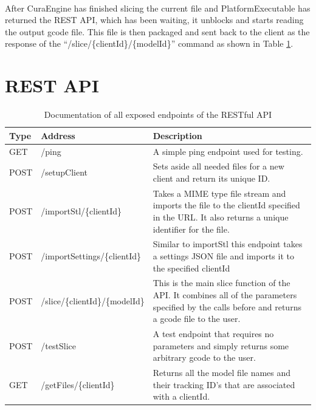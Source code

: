 \paragraph{}
After CuraEngine has finished slicing the current file and PlatformExecutable has returned the REST API, which has been waiting, it unblocks and starts reading the output gcode file.
This file is then packaged and sent back to the client as the response of the ``/slice/\{clientId\}/\{modelId\}'' command as shown in Table \ref{tab:restapi}.

\section{REST API}
\begin{table}[h]
  \centering
    \begin{tabularx}{\textwidth}{ |l|l|X| }
      \hline
      Type & Address & Description \\ \hline
      \hline
      GET & /ping & A simple ping endpoint used for testing. \\ \hline
      POST & /setupClient & Sets aside all needed files for a new client and return its unique ID. \\ \hline
      POST & /importStl/\{clientId\} & Takes a MIME type file stream and imports the file to the clientId specified in the URL. It also returns a unique identifier for the file. \\ \hline
      POST & /importSettings/\{clientId\} & Similar to importStl this endpoint takes a settings JSON file and imports it to the specified clientId \\ \hline
      POST & /slice/\{clientId\}/\{modelId\} & This is the main slice function of the API. It combines all of the parameters specified by the calls before and returns a gcode file to the user. \\ \hline
      POST & /testSlice & A test endpoint that requires no parameters and simply returns some arbitrary gcode to the user. \\ \hline
      GET & /getFiles/\{clientId\} & Returns all the model file names and their tracking ID's that are associated with a clientId. \\ \hline
    \end{tabularx}
  \caption{Documentation of all exposed endpoints of the RESTful API}
  \label{tab:restapi}
\end{table}

